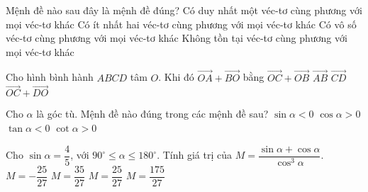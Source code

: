 \begin{ex}%
	Mệnh đề nào sau đây là mệnh đề đúng?	
	\choice
	{\True Có duy nhất một véc-tơ cùng phương với mọi véc-tơ khác}
	{Có ít nhất hai véc-tơ cùng phương với mọi véc-tơ khác}
	{Có vô số véc-tơ cùng phương với mọi véc-tơ khác}
	{Không tồn tại véc-tơ cùng phương với mọi véc-tơ khác}
\end{ex}

\begin{ex}%
	Cho hình bình hành $ABCD$ tâm $O$. Khi đó $\vec{OA}+\vec{BO}$ bằng
	\choice
	{$\vec{OC}+\vec{OB}$}
	{$\vec{AB}$}
	{\True $\vec{CD}$}
	{$\vec{OC}+\vec{DO}$}
\end{ex}


\begin{ex}%
	Cho $\alpha$ là góc tù. Mệnh đề nào đúng trong các mệnh đề sau?
	\choice
	{$\sin\alpha<0$}
	{$\cos\alpha>0$}
	{\True $\tan\alpha<0$}
	{$\cot\alpha>0$}
\end{ex}


\begin{ex}%
	Cho $\sin\alpha=\dfrac{4}{5}$, với $90^\circ\leq\alpha\leq 180^\circ$. Tính giá trị của $M=\dfrac{\sin\alpha+\cos\alpha}{\cos^3\alpha}$.
	\choice
	{\True $M=-\dfrac{25}{27}$}
	{$M=\dfrac{35}{27}$}
	{$M=\dfrac{25}{{27}}$}
	{$M=\dfrac{175}{{27}}$}
\end{ex}


